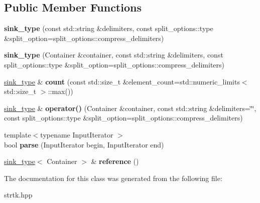 \subsection*{Public Member Functions}
\begin{DoxyCompactItemize}
\item 
\hypertarget{classstrtk_1_1sink__type_a50119db41ab724e9c80ef4bddcc3f724}{{\bfseries sink\-\_\-type} (const std\-::string \&delimiters, const split\-\_\-options\-::type \&split\-\_\-option=split\-\_\-options\-::compress\-\_\-delimiters)}\label{classstrtk_1_1sink__type_a50119db41ab724e9c80ef4bddcc3f724}

\item 
\hypertarget{classstrtk_1_1sink__type_a84c61d6ff2e81db702d304bbd40a3035}{{\bfseries sink\-\_\-type} (Container \&container, const std\-::string \&delimiters, const split\-\_\-options\-::type \&split\-\_\-option=split\-\_\-options\-::compress\-\_\-delimiters)}\label{classstrtk_1_1sink__type_a84c61d6ff2e81db702d304bbd40a3035}

\item 
\hypertarget{classstrtk_1_1sink__type_afc98fc4571ad27ffc8605cf8f4244f09}{\hyperlink{classstrtk_1_1sink__type}{sink\-\_\-type} \& {\bfseries count} (const std\-::size\-\_\-t \&element\-\_\-count=std\-::numeric\-\_\-limits$<$ std\-::size\-\_\-t $>$\-::max())}\label{classstrtk_1_1sink__type_afc98fc4571ad27ffc8605cf8f4244f09}

\item 
\hypertarget{classstrtk_1_1sink__type_a34d8a898a9e5589a2be7220080f3879a}{\hyperlink{classstrtk_1_1sink__type}{sink\-\_\-type} \& {\bfseries operator()} (Container \&container, const std\-::string \&delimiters=\char`\"{}\char`\"{}, const split\-\_\-options\-::type \&split\-\_\-option=split\-\_\-options\-::compress\-\_\-delimiters)}\label{classstrtk_1_1sink__type_a34d8a898a9e5589a2be7220080f3879a}

\item 
\hypertarget{classstrtk_1_1sink__type_ac6feb69625b527e79dba8da49aff41bc}{{\footnotesize template$<$typename Input\-Iterator $>$ }\\bool {\bfseries parse} (Input\-Iterator begin, Input\-Iterator end)}\label{classstrtk_1_1sink__type_ac6feb69625b527e79dba8da49aff41bc}

\item 
\hypertarget{classstrtk_1_1sink__type_a2172f359e0148097fef2ba09675df9d8}{\hyperlink{classstrtk_1_1sink__type}{sink\-\_\-type}$<$ Container $>$ \& {\bfseries reference} ()}\label{classstrtk_1_1sink__type_a2172f359e0148097fef2ba09675df9d8}

\end{DoxyCompactItemize}


The documentation for this class was generated from the following file\-:\begin{DoxyCompactItemize}
\item 
strtk.\-hpp\end{DoxyCompactItemize}
